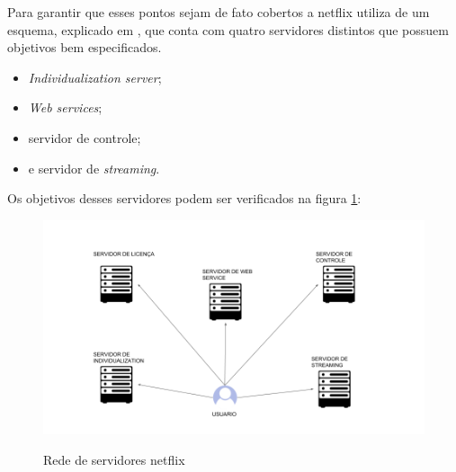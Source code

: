 Para garantir que esses pontos sejam de fato cobertos a netflix utiliza de um esquema, explicado em \cite{pomelo2009analysis}, que conta com quatro servidores distintos que possuem objetivos bem especificados.
\begin{itemize}
\item \textit{Individualization server};
\item \textit{Web services};
\item servidor de controle;
\item e servidor de \textit{streaming}.  
\end{itemize}
Os objetivos desses servidores podem ser verificados na figura \ref{figura:servidores_netflix}:
\begin{figure}[H]
\caption{Rede de servidores netflix}
\includegraphics[width=14cm]{Figuras/servidores_netflix.png} 
\label{figura:servidores_netflix}
\end{figure}